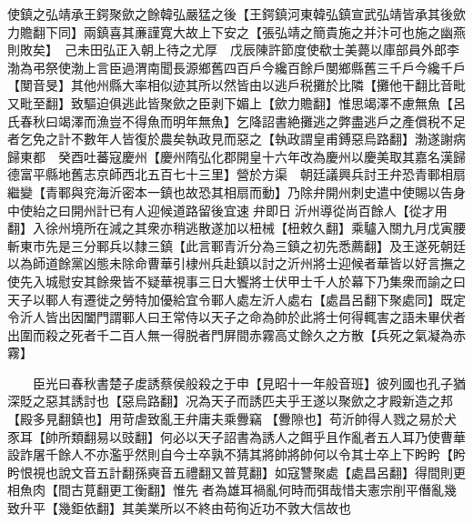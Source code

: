 使鎮之弘靖承王鍔聚歛之餘韓弘嚴猛之後【王鍔鎮河東韓弘鎮宣武弘靖皆承其後歛力贍翻下同】兩鎮喜其亷謹寛大故上下安之【張弘靖之簡貴施之并汴可也施之幽燕則敗矣】　己未田弘正入朝上待之尤厚　戊辰陳許節度使欷士美薨以庫部員外郎李渤為弔祭使渤上言臣過渭南聞長源鄉舊四百戶今纔百餘戶閺鄉縣舊三千戶今纔千戶【閺音旻】其他州縣大率相似迹其所以然皆由以逃戶税攤於比隣【攤他干翻比音毗又毗至翻】致驅迫俱逃此皆聚歛之臣剥下媚上【歛力贍翻】惟思竭澤不慮無魚【呂氏春秋曰竭澤而漁豈不得魚而明年無魚】乞降詔書絶攤逃之弊盡逃戶之產償税不足者乞免之計不數年人皆復於農矣執政見而惡之【執政謂皇甫鎛惡烏路翻】渤遂謝病歸東都　癸酉吐蕃寇慶州【慶州隋弘化郡開皇十六年改為慶州以慶美取其嘉名漢歸德富平縣地舊志京師西北五百七十三里】營於方渠　朝廷議興兵討王弁恐青鄆相扇繼變【青鄆與兖海沂密本一鎮也故恐其相扇而動】乃除弁開州刺史遣中使賜以告身中使紿之曰開州計已有人迎候道路留後宜速弁即日沂州導從尚百餘人【從才用翻】入徐州境所在減之其衆亦稍逃散遂加以杻械【杻敕久翻】乘驢入關九月戊寅腰斬東市先是三分鄆兵以隸三鎮【此言鄆青沂分為三鎮之初先悉薦翻】及王遂死朝廷以為師道餘黨凶態未除命曹華引棣州兵赴鎮以討之沂州將士迎候者華皆以好言撫之使先入城慰安其餘衆皆不疑華視事三日大饗將士伏甲士千人於幕下乃集衆而諭之曰天子以鄆人有遷徙之勞特加優給宜令鄆人處左沂人處右【處昌呂翻下聚處同】既定令沂人皆出因闔門謂鄆人曰王常侍以天子之命為帥於此將士何得輒害之語未畢伏者出圍而殺之死者千二百人無一得脱者門屏間赤霧高丈餘久之方散【兵死之氣凝為赤霧】

　　臣光曰春秋書楚子䖍誘蔡侯般殺之于申【見昭十一年般音班】彼列國也孔子猶深貶之惡其誘討也【惡烏路翻】况為天子而誘匹夫乎王遂以聚歛之才殿新造之邦【殿多見翻鎮也】用苛虐致亂王弁庸夫乘釁竊【釁隙也】苟沂帥得人戮之易於犬豕耳【帥所類翻易以豉翻】何必以天子詔書為誘人之餌乎且作亂者五人耳乃使曹華設詐屠千餘人不亦濫乎然則自今士卒孰不猜其將帥將帥何以令其士卒上下盻盻【盻盻恨視也說文音五計翻孫奭音五禮翻又普莧翻】如寇讐聚處【處昌呂翻】得間則更相魚肉【間古莧翻更工衡翻】惟先者為雄耳禍亂何時而弭哉惜夫憲宗削平僭亂幾致升平【幾鉅依翻】其美業所以不終由苟徇近功不敦大信故也

